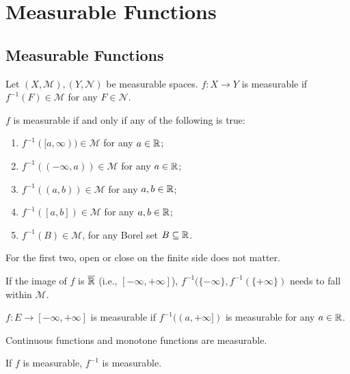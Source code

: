 \documentclass[class=book, crop=false]{standalone}
\begin{document}
    \section{Measurable Functions}
        \subsection{Measurable Functions}
        \begin{definition}
            Let $(X, \mathcal{M}), (Y, \mathcal{N})$ be measurable spaces. $f : X \rightarrow Y$ is measurable if $f^{-1}(F) \in \mathscr{M}$ for any $F \in \mathcal{N}$.
        \end{definition}

        \begin{theorem}
            $f$ is measurable if and only if any of the following is true:
            \begin{enumerate}
                \item $f^{-1}([a, \infty)) \in \mathcal{M}$ for any $a \in \mathbb{R}$;
                \item $f^{-1}((-\infty, a)) \in \mathcal{M}$ for any $a \in \mathbb{R}$;
                \item $f^{-1}((a, b)) \in \mathcal{M}$ for any $a, b \in \mathbb{R}$;
                \item $f^{-1}([a, b]) \in \mathcal{M}$ for any $a, b \in \mathbb{R}$;
                \item $f^{-1}(B) \in \mathcal{M}$, for any Borel set $B \subseteq \mathbb{R}$.
            \end{enumerate}
        \end{theorem}
        \begin{remark}
            For the first two, open or close on the finite side does not matter.
        \end{remark}
        \begin{remark}
            If the image of $f$ is $\overline{\mathbb{R}}$ (i.e., $[-\infty, +\infty]$), $f^{-1}(\{-\infty\}, f^{-1}(\{+\infty\})$ needs to fall within $\mathcal{M}$.
        \end{remark}

        \begin{theorem}
            $f : E \rightarrow [-\infty, +\infty]$ is measurable if $f^{-1}((a, +\infty])$ is measurable for any $a \in \mathbb{R}$.
        \end{theorem}

        \begin{theorem}
            Continuous functions and monotone functions are measurable.
        \end{theorem}
        \begin{corollary}
            If $f$ is measurable, $f^{-1}$ is measurable.
        \end{corollary}
\end{document}
